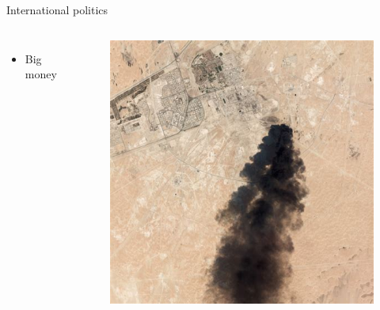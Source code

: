 \documentclass{beamer}
\begin{document}
\begin{frame}{International politics}
\begin{columns}
\begin{itemize}
    \item Big money
\end{itemize}{}
\begin{figure}
    \centering
    \includegraphics[width=\textwidth]{../img/oilhit.jpg}
\end{figure}
\end{columns}
\end{frame}{}
\end{document}
